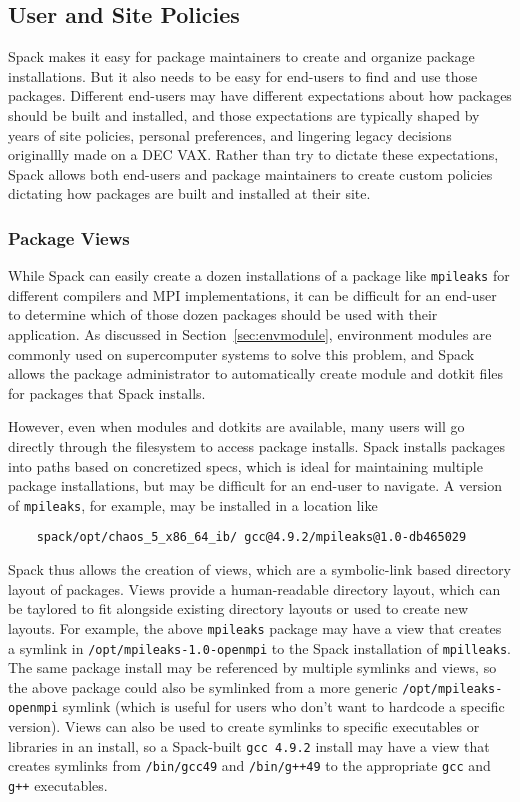 
\subsection{User and Site Policies}
\label{sec:usecase-policy}

Spack makes it easy for package maintainers to create and organize package installations.
But it also needs to be easy for end-users to find and use those packages.
Different end-users may have different expectations about how packages should be built and installed,
and those expectations are typically shaped by years of site policies, personal preferences,
and lingering legacy decisions originallly made on a DEC VAX.
Rather than try to dictate these expectations,
Spack allows both end-users and package maintainers to create custom policies dictating
how packages are built and installed at their site.

\subsubsection{Package Views}
\label{sec:package-views}

While Spack can easily create a dozen installations of a package like {\tt mpileaks}
for different compilers and MPI implementations,
it can be difficult for an end-user to determine which of those dozen packages should be used with their application.
As discussed in Section~\ref{sec:envmodule},
environment modules are commonly used on supercomputer systems to solve this problem,
and Spack allows the package administrator to automatically create module and dotkit files for packages that Spack installs.

However, even when modules and dotkits are available,
many users will go directly through the filesystem to access package installs.
Spack installs packages into paths based on concretized specs,
which is ideal for maintaining multiple package installations, but may be difficult for an end-user to navigate.
A version of {\tt mpileaks}, for example, may be installed in a location like
%
\begin{verbatim}
    spack/opt/chaos_5_x86_64_ib/ gcc@4.9.2/mpileaks@1.0-db465029
\end{verbatim}
%
Spack thus allows the creation of views, which are a symbolic-link based directory layout of packages.
Views provide a human-readable directory layout,
which can be taylored to fit alongside existing directory layouts or used to create new layouts.
For example, the above {\tt mpileaks} package may have a view that creates a symlink in
{\tt /opt/mpileaks-1.0-openmpi} to the Spack installation of {\tt mpilleaks}.
The same package install may be referenced by multiple symlinks and views,
so the above package could also be symlinked from a more generic {\tt /opt/mpileaks-openmpi}
symlink (which is useful for users who don't want to hardcode a specific version).
Views can also be used to create symlinks to specific executables or libraries in an install,
so a Spack-built {\tt gcc 4.9.2} install may have a view that creates symlinks from
{\tt /bin/gcc49} and {\tt /bin/g++49} to the appropriate {\tt gcc} and {\tt g++} executables.


